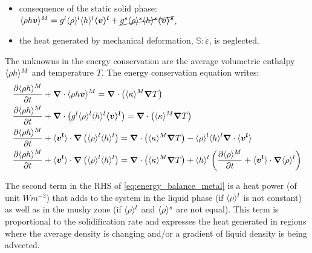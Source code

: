 \begin{itemize}
\itemsep0em
\item consequence of the static solid phase: $\langle \rho h \boldsymbol{v} \rangle^M = {g^l} \langle \rho \rangle^l \langle h \rangle^l \boldsymbol{\langle v \rangle^l} +  \cancel{{g^s} \langle \rho \rangle^s \langle h \rangle^s \boldsymbol{\langle v \rangle^s}}$,
\item the heat generated by mechanical deformation, $\mathbb{S}:\dot{\varepsilon}$, is neglected.
\end{itemize}
The unknowns in the energy conservation are the average volumetric enthalpy $\langle \rho h \rangle^M$ and temperature $T$.
The energy conservation equation writes:
\begin{subequations}
\begin{align}
	& \tempup{\avg{\rho h}^M} + \nabvec \cdot \avg{\rho h \vec{v}}^M 
	= \nabvec  \cdot \brac{\avg{\kappa}^M \nabvec T } \\
	& \tempup{\avg{\rho h}^M} + \nabvec \cdot \brac{ \gl \rhol \hl \vl} 
	= \nabvec  \cdot \brac{\avg{\kappa}^M \nabvec T } \\
	& \tempup{\avg{\rho h}^M}
		+ \vit \cdot \nabvec \brac{\rhol \hl}
		= \nabvec  \cdot \brac{\avg{\kappa}^M \nabvec T }
		  - \rhol \hl  \nabvec \cdot \vit \\   
	\label{eq:energy_balance_metal}
	& \tempup{\avg{\rho h}^M}
		+ \vit \cdot \nabvec \brac{\rhol \hl}
		= \nabvec  \cdot \brac{\avg{\kappa}^M \nabvec T }
		+ \hl \brac{\tempup{\avg{\rho}^M} + \vit \cdot  \nabvec \rhol} 
\end{align}
\end{subequations} 

The second term in the RHS of \cref{eq:energy_balance_metal} is a heat power (of unit $Wm^{-3}$) 
that adds to the system in the liquid phase (if $\langle \rho \rangle^l$ is not constant) as well as in the mushy zone (if $\langle \rho \rangle^l$ and $\langle \rho \rangle^s$ are not equal). 
This term is proportional to the solidification rate and expresses 
the heat generated in regions where the average density is changing and/or a gradient of liquid density is being advected.

